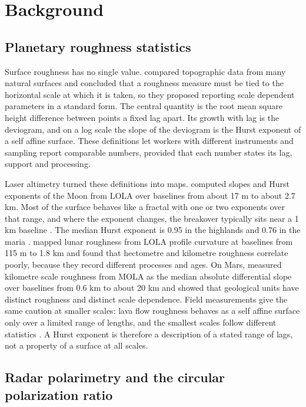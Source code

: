 \section{Background}
\label{sec:background}

\subsection{Planetary roughness statistics}

Surface roughness has no single value. \citet{shepard2001} compared topographic data from many
natural surfaces and concluded that a roughness measure must be tied to the horizontal scale at
which it is taken, so they proposed reporting scale dependent parameters in a standard form. The
central quantity is the root mean square height difference between points a fixed lag apart. Its
growth with lag is the deviogram, and on a log scale the slope of the deviogram is the Hurst
exponent of a self affine surface. These definitions let workers with different instruments and
sampling report comparable numbers, provided that each number states its lag, support and processing.

Laser altimetry turned these definitions into maps. \citet{rosenburg2011} computed slopes and
Hurst exponents of the Moon from LOLA over baselines from about 17 m to about 2.7 km. Most of the
surface behaves like a fractal with one or two exponents over that range, and where the exponent
changes, the breakover typically sits near a 1 km baseline \citep{rosenburg2011}. The median Hurst
exponent is 0.95 in the highlands and 0.76 in the maria \citep{rosenburg2011}. \citet{kreslavsky2013}
mapped lunar roughness from LOLA profile curvature at baselines from 115 m to 1.8 km and found that
hectometre and kilometre roughness correlate poorly, because they record different processes and
ages. On Mars, \citet{kreslavsky2000} measured kilometre scale roughness from MOLA as the median absolute differential slope over baselines from 0.6 km to about 20 km and showed that geological units
have distinct roughness and distinct scale dependence. Field measurements give the same caution
at smaller scales: lava flow roughness behaves as a self affine surface only over a limited range
of lengths, and the smallest scales follow different statistics \citep{campbell1996}. A Hurst
exponent is therefore a description of a stated range of lags, not a property of a surface at all
scales.

\subsection{Radar polarimetry and the circular polarization ratio}

